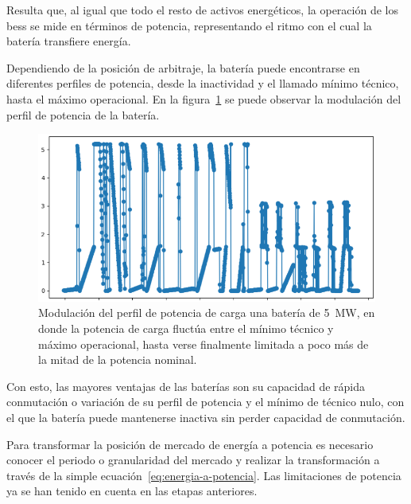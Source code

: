 Resulta que, al igual que todo el resto de activos energéticos, la operación de los \gls{bess} se mide en términos de potencia, representando el ritmo con el cual la batería transfiere energía.

Dependiendo de la posición de arbitraje, la batería puede encontrarse en diferentes perfiles de potencia, desde la inactividad y el llamado mínimo técnico, hasta el máximo operacional. En la figura~\ref{fig:perfil-potencia} se puede observar la modulación del perfil de potencia de la batería.

\begin{figure}
  \centering
  \includegraphics[width=0.75\linewidth]{figures/perfil-potencia.png}
  \caption[Modulación del perfil de potencia de una batería.]{Modulación del perfil de potencia de carga una batería de \SI{5}{\mega\watt}, en donde la potencia de carga fluctúa entre el mínimo técnico y máximo operacional, hasta verse finalmente limitada a poco más de la mitad de la potencia nominal.}
  \label{fig:perfil-potencia}
\end{figure}

Con esto, las mayores ventajas de las baterías son su capacidad de rápida conmutación o variación de su perfil de potencia y el mínimo de técnico nulo, con el que la batería puede mantenerse inactiva sin perder capacidad de conmutación.

Para transformar la posición de mercado de energía a potencia es necesario conocer el periodo o granularidad del mercado y realizar la transformación a través de la simple ecuación~\ref{eq:energia-a-potencia}. Las limitaciones de potencia ya se han tenido en cuenta en las etapas anteriores.

